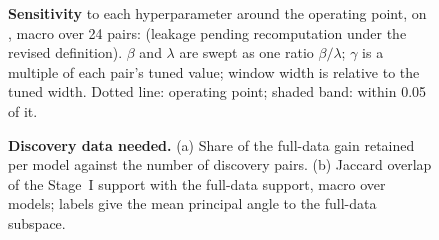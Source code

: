 \begin{figure}[!htbp]
  \centering
  \caption{\textbf{Sensitivity} to each hyperparameter around the operating point, on \Ddev, macro over 24 pairs:  (leakage pending recomputation under the revised definition). $\beta$ and $\lambda$ are swept as one ratio $\beta/\lambda$; $\gamma$ is a multiple of each pair's tuned value; window width is relative to the tuned width. Dotted line: operating point; shaded band:  within 0.05 of it.}
  \label{fig:app-sensitivity}
\end{figure}

\begin{figure}[!htbp]
  \centering
  \caption{\textbf{Discovery data needed.} (a) Share of the full-data  gain retained per model against the number of discovery pairs. (b) Jaccard overlap of the Stage~I support with the full-data support, macro over models; labels give the mean principal angle to the full-data subspace.}
  \label{fig:app-sample-efficiency}
\end{figure}

